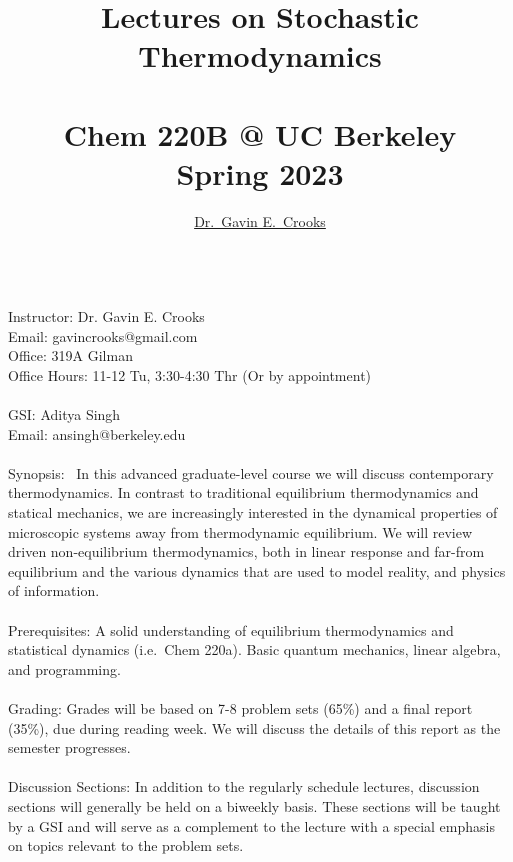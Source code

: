 \documentclass[article,notes]{bespoke6}
\newcommand{\thetitle}{Lectures on Stochastic Thermodynamics}
\newcommand{\theauthor}{Dr.\ Gavin E.\ Crooks}
\newcommand{\self}{_disorder}			%
\begin{document}

\nocite{}


\title{\color{\titlecolor}\thetitle \\ ~  \\ Chem 220B @ UC Berkeley \\ Spring 2023 }
\author{\href{http://threeplusone.com/}{\theauthor}}
\date{}
\maketitle
\thispagestyle{empty}

~\\
Instructor: Dr. Gavin E. Crooks \\
Email: gavincrooks@gmail.com \\
Office: 319A Gilman \\
Office Hours: 11-12 Tu, 3:30-4:30 Thr (Or by appointment)\\
~\\
GSI: Aditya Singh \\
Email: ansingh@berkeley.edu\\
~\\
Synopsis:~ In this advanced graduate-level course we will discuss contemporary thermodynamics. In contrast to traditional equilibrium thermodynamics and statical mechanics, we are increasingly interested in the dynamical properties of microscopic systems away from thermodynamic equilibrium. We will review driven non-equilibrium thermodynamics, both in linear response and far-from equilibrium and the various dynamics that are used to model reality, and physics of information.
\\~\\
Prerequisites: A solid understanding of equilibrium thermodynamics and statistical dynamics (i.e.~Chem 220a). Basic quantum mechanics, linear algebra, and programming.
\\~\\
Grading: Grades will be based on 7-8 problem sets (65\%) and a final report (35\%), due during reading week. We will discuss the details of this report as the semester progresses.
\\~\\
Discussion Sections: In addition to the regularly schedule lectures, discussion sections will generally be held on a biweekly basis. These sections will be taught by a GSI and will serve as a complement to the lecture with a special emphasis on topics relevant to the problem sets.
\\~\\
\end{document}
